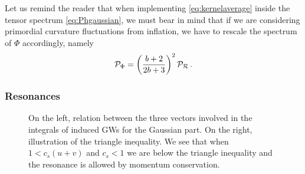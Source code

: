 \documentclass[a4paper,11pt]{article}
\numberwithin{equation}{section}
\begin{document}
Let us remind the reader that when implementing \eqref{eq:kernelaverage} inside the tensor spectrum \eqref{eq:Phgaussian}, we must bear in mind that if we are considering primordial curvature fluctuations from inflation, we have to rescale the spectrum of $\Phi$ accordingly, namely
\begin{equation}\label{eq:pphitopR}
{\cal P}_{\Phi}=\left(\frac{b+2}{2b+3}\right)^2{\cal P}_{\cal R}\,.
\end{equation}

\subsubsection{Resonances}


\begin{figure}
\centering
{}
\hspace{2cm}
\caption{On the left, relation between the three vectors involved in the integrals of induced GWs for the Gaussian part. On the right, illustration of the triangle inequality. We see that when $1<c_s(u+v)$ and $c_s<1$ we are below the triangle inequality and the resonance is allowed by momentum conservation.  \label{fig:triangle}}
\end{figure}
\end{document}

